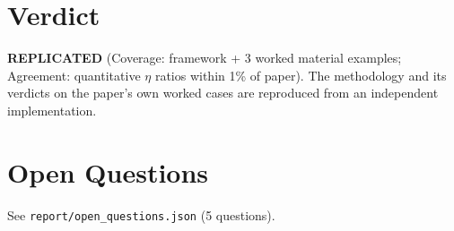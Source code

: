 \documentclass[11pt]{article}
\begin{document}
\section{Verdict}
\textbf{REPLICATED} (Coverage: framework + 3 worked material examples; Agreement:
quantitative $\eta$ ratios within 1\% of paper). The methodology and its
verdicts on the paper's own worked cases are reproduced from an independent
implementation.

\section{Open Questions}
See \texttt{report/open\_questions.json} (5 questions).
\end{document}
